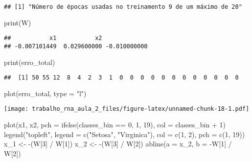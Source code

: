 \documentclass[
]{article}
\newenvironment{Shaded}{\begin{snugshade}}{\end{snugshade}}
\newcommand{\AttributeTok}[1]{\textcolor[rgb]{0.77,0.63,0.00}{#1}}
\newcommand{\DecValTok}[1]{\textcolor[rgb]{0.00,0.00,0.81}{#1}}
\newcommand{\FunctionTok}[1]{\textcolor[rgb]{0.00,0.00,0.00}{#1}}
\newcommand{\NormalTok}[1]{#1}
\newcommand{\OtherTok}[1]{\textcolor[rgb]{0.56,0.35,0.01}{#1}}
\newcommand{\SpecialCharTok}[1]{\textcolor[rgb]{0.00,0.00,0.00}{#1}}
\newcommand{\StringTok}[1]{\textcolor[rgb]{0.31,0.60,0.02}{#1}}
\begin{document}
\begin{verbatim}
## [1] "Número de épocas usadas no treinamento 9 de um máximo de 20"
\end{verbatim}

\begin{Shaded}
\begin{Highlighting}[]
\FunctionTok{print}\NormalTok{(W)}
\end{Highlighting}
\end{Shaded}

\begin{verbatim}
##           x1           x2              
## -0.007101449  0.029600000 -0.010000000
\end{verbatim}

\begin{Shaded}
\begin{Highlighting}[]
\FunctionTok{print}\NormalTok{(erro\_total)}
\end{Highlighting}
\end{Shaded}

\begin{verbatim}
##  [1] 50 55 12  8  4  2  3  1  0  0  0  0  0  0  0  0  0  0  0  0
\end{verbatim}

\begin{Shaded}
\begin{Highlighting}[]
\FunctionTok{plot}\NormalTok{(erro\_total, }\AttributeTok{type =} \StringTok{"l"}\NormalTok{)}
\end{Highlighting}
\end{Shaded}

\texttt{[image: trabalho\_rna\_aula\_2\_files/figure-latex/unnamed-chunk-18-1.pdf]}

\begin{Shaded}
\begin{Highlighting}[]
\FunctionTok{plot}\NormalTok{(x1, x2, }\AttributeTok{pch =} \FunctionTok{ifelse}\NormalTok{(classes\_bin }\SpecialCharTok{==} \DecValTok{0}\NormalTok{, }\DecValTok{1}\NormalTok{, }\DecValTok{19}\NormalTok{), }\AttributeTok{col =}\NormalTok{ classes\_bin }\SpecialCharTok{+} \DecValTok{1}\NormalTok{)}
\FunctionTok{legend}\NormalTok{(}\StringTok{"topleft"}\NormalTok{, }\AttributeTok{legend =} \FunctionTok{c}\NormalTok{(}\StringTok{"Setosa"}\NormalTok{, }\StringTok{"Virginica"}\NormalTok{), }\AttributeTok{col =} \FunctionTok{c}\NormalTok{(}\DecValTok{1}\NormalTok{, }\DecValTok{2}\NormalTok{), }\AttributeTok{pch =} \FunctionTok{c}\NormalTok{(}\DecValTok{1}\NormalTok{, }\DecValTok{19}\NormalTok{))}
\NormalTok{x\_1 }\OtherTok{\textless{}{-}} \SpecialCharTok{{-}}\NormalTok{(W[}\DecValTok{3}\NormalTok{] }\SpecialCharTok{/}\NormalTok{ W[}\DecValTok{1}\NormalTok{])}
\NormalTok{x\_2 }\OtherTok{\textless{}{-}} \SpecialCharTok{{-}}\NormalTok{(W[}\DecValTok{3}\NormalTok{] }\SpecialCharTok{/}\NormalTok{ W[}\DecValTok{2}\NormalTok{])}
\FunctionTok{abline}\NormalTok{(}\AttributeTok{a =}\NormalTok{ x\_2, }\AttributeTok{b =} \SpecialCharTok{{-}}\NormalTok{W[}\DecValTok{1}\NormalTok{] }\SpecialCharTok{/}\NormalTok{ W[}\DecValTok{2}\NormalTok{])}
\end{Highlighting}
\end{Shaded}
\end{document}
